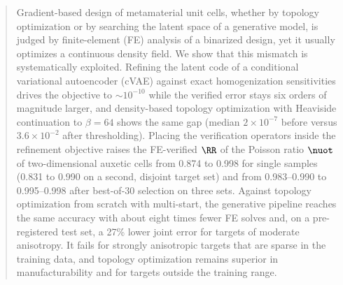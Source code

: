 
\begin{abstract}
Gradient-based design of metamaterial unit cells, whether by topology
optimization or by searching the latent space of a generative model, is
judged by finite-element (FE) analysis of a binarized design, yet it usually
optimizes a continuous density field. We show that this mismatch is
systematically exploited. Refining the latent code of a conditional
variational autoencoder (cVAE) against exact homogenization sensitivities
drives the objective to $\sim\!10^{-10}$ while the verified error stays six
orders of magnitude larger, and density-based topology optimization with
Heaviside continuation to $\beta=64$ shows the same gap (median $2\times10^{-7}$
before versus $3.6\times10^{-2}$ after thresholding). Placing the verification
operators inside the refinement objective raises the FE-verified $\RR$ of
the Poisson ratio $\nuot$ of two-dimensional auxetic cells from 0.874 to 0.998
for single samples (0.831 to 0.990 on a second, disjoint target set) and
from 0.983--0.990 to 0.995--0.998 after best-of-30 selection on three sets.
Against topology optimization from scratch with multi-start, the generative
pipeline reaches the same accuracy with about eight times fewer FE solves
and, on a pre-registered test set, a 27\% lower joint error for targets of
moderate anisotropy. It fails for strongly anisotropic targets that are
sparse in the training data, and topology optimization remains superior in
manufacturability and for targets outside the training range.
\end{abstract}

